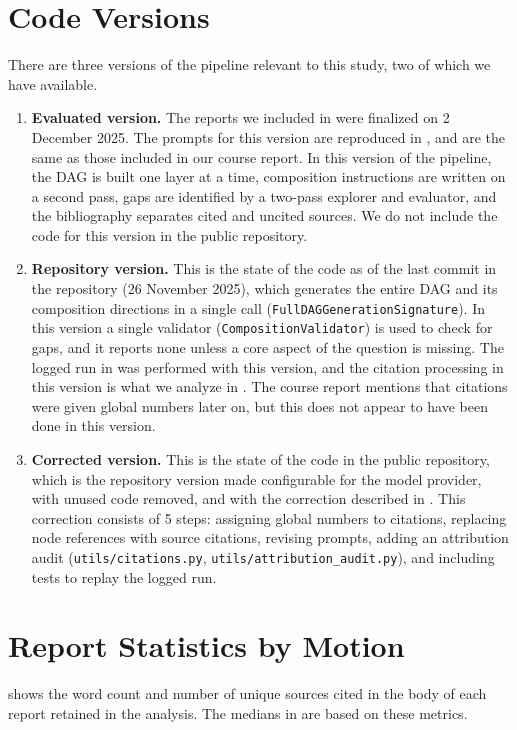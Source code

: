 \section{Code Versions}
\label{app:changes}
There are three versions of the pipeline relevant to this study, two of which we have available.
\begin{enumerate}
    \item \textbf{Evaluated version.} The reports we included in  were finalized on 2 December 2025. The prompts for this version are reproduced in , and are the same as those included in our course report. In this version of the pipeline, the DAG is built one layer at a time, composition instructions are written on a second pass, gaps are identified by a two-pass explorer and evaluator, and the bibliography separates cited and uncited sources. We do not include the code for this version in the public repository.
    \item \textbf{Repository version.} This is the state of the code as of the last commit in the repository (26 November 2025), which generates the entire DAG and its composition directions in a single call (\texttt{FullDAGGenerationSignature}). In this version a single validator (\texttt{CompositionValidator}) is used to check for gaps, and it reports none unless a core aspect of the question is missing. The logged run in  was performed with this version, and the citation processing in this version is what we analyze in . The course report mentions that citations were given global numbers later on, but this does not appear to have been done in this version.
    \item \textbf{Corrected version.} This is the state of the code in the public repository, which is the repository version made configurable for the model provider, with unused code removed, and with the correction described in . This correction consists of 5 steps: assigning global numbers to citations, replacing node references with source citations, revising prompts, adding an attribution audit (\texttt{utils/citations.py}, \texttt{utils/attribution\_audit.py}), and including tests to replay the logged run.
\end{enumerate}

\section{Report Statistics by Motion}
\label{app:reports}
 shows the word count and number of unique sources cited in the body of each report retained in the analysis. The medians in  are based on these metrics.

